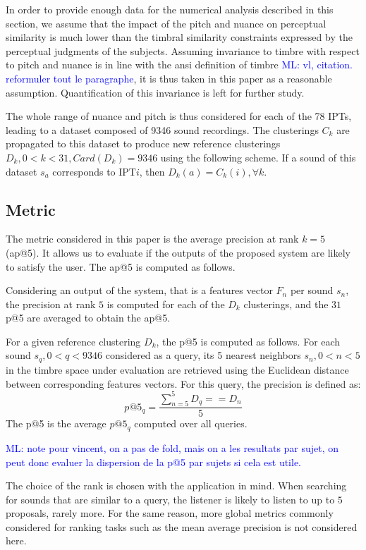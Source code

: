 \documentclass{bmcart}
\newcommand{\ipt}{IPT\xspace}
\newcommand{\ipts}{IPTs\xspace}
\newcommand{\ml}[1]{\textcolor{blue}{ML: #1}}
\begin{document}
In order to provide enough data for the numerical analysis described in this section, we assume that the impact of the pitch and nuance on perceptual similarity is much lower than the timbral similarity constraints expressed by the perceptual judgments of the subjects. Assuming invariance to timbre with respect to pitch and nuance is in line with the ansi definition of timbre \ml{vl, citation. reformuler tout le paragraphe}, it is  thus taken in this paper as a reasonable assumption. Quantification of this invariance is left for further study.

The whole range of nuance and pitch is thus considered for each of the 78 \ipts, leading to a dataset composed of 9346 sound recordings. The clusterings $C_k$ are propagated to this dataset to produce new reference clusterings $D_k, 0<k<31, Card(D_k)=9346$ using the following scheme. If a sound of this dataset $s_a$ corresponds to \ipt $i$, then $D_k(a) = C_k(i), \forall k$.

\subsection*{Metric}

The metric considered in this paper is the average precision at rank $k=5$ (ap@5). It allows us to evaluate if the outputs of the proposed system are likely to satisfy the user. The ap@5 is computed as follows.

Considering an output of the system, that is a features vector $F_n$ per sound $s_n$, the precision at rank $5$ is computed for each of the $D_k$ clusterings, and the $31$ p@5 are averaged to obtain the ap@5.

For a given reference clustering $D_k$, the p@5 is computed as follows. For each sound $s_q, 0<q<9346$ considered as a query, its 5 nearest neighbors $s_n, 0<n<5$ in the timbre space under evaluation are retrieved using the Euclidean distance between corresponding features vectors. For this query, the precision is defined as:
$$
p@5_q = \frac{\sum_{n=5}^5 D_q==D_n}{5}
$$
The p@5 is the average $p@5_q$ computed over all queries.

\ml{note pour vincent, on a pas de fold, mais on a les resultats par sujet, on peut donc evaluer la dispersion de la p@5 par sujets si cela est utile.}

The choice of the rank is chosen with the application in mind. When searching for sounds that are similar to a query, the listener is likely to listen to up to $5$ proposals, rarely more. For the same reason, more global metrics commonly considered for ranking tasks such as the mean average precision is not considered here.
\end{document}
